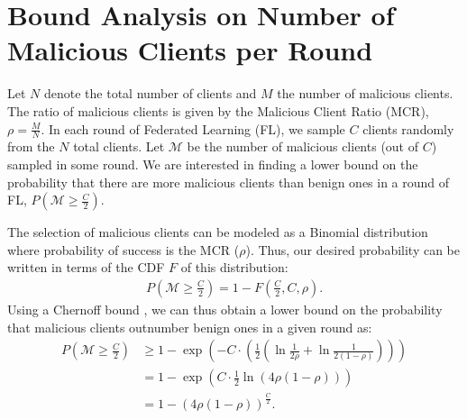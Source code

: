\section{Bound Analysis on Number of Malicious Clients per Round}
\label{app:bound_analysis}

Let \( N \) denote the total number of clients and \( M \) the number of malicious clients. The ratio of malicious clients is given by the Malicious Client Ratio (MCR), \( \rho = \frac{M}{N} \). In each round of Federated Learning (FL), we sample \( C \) clients randomly from the \( N \) total clients.
%
Let $\mathcal{M}$ be the number of malicious clients (out of $C$) sampled in some round. We are interested in finding a lower bound on the probability that there are more malicious clients than benign ones in a round of FL, \ie \( P\left(\mathcal{M} \geq \frac{C}{2}\right) \).

The selection of malicious clients can be modeled as a Binomial distribution where probability of success is the MCR ($\rho$). Thus,  our desired probability can be written in terms of the CDF $F$ of this distribution:
\begin{align}
    P\left(\mathcal{M} \geq \frac{C}{2}\right) = 1 - F\left(\frac{C}{2}, C, \rho\right).
\end{align}
Using a Chernoff bound \citep{arratia1989tutorial}, we can thus obtain a lower bound on the probability that malicious clients outnumber benign ones in a given round as:
\begin{align}
    P\left(\mathcal{M} \geq \frac{C}{2}\right) &\geq 1 - \exp\left(-C \cdot \left(\frac{1}{2}\left(\ln\frac{1}{2\rho} + \ln\frac{1}{2(1-\rho)}\right)\right)\right) \\
    & = 1 - \exp\left(C \cdot \frac{1}{2} \ln\left(4\rho(1-\rho)\right)\right) \\
    & = 1 - \left(4\rho(1-\rho)\right)^{\frac{C}{2}}.
\end{align}

